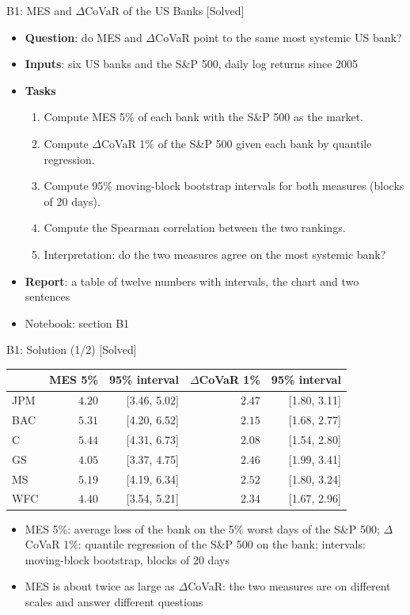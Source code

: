 \begin{frame}{B1: MES and $\Delta$CoVaR of the US Banks [Solved]}
\itemsize{\footnotesize}
\begin{itemize}
\item \textbf{Question}: do MES and $\Delta$CoVaR point to the same most systemic US bank?
\item \textbf{Inputs}: six US banks and the S\&P 500, daily log returns since 2005
\item \textbf{Tasks}
\begin{enumerate}
    \item Compute MES 5\% of each bank with the S\&P 500 as the market.
    \item Compute $\Delta$CoVaR 1\% of the S\&P 500 given each bank by quantile regression.
    \item Compute 95\% moving-block bootstrap intervals for both measures (blocks of 20 days).
    \item Compute the Spearman correlation between the two rankings.
    \item Interpretation: do the two measures agree on the most systemic bank?
\end{enumerate}
\item \textbf{Report}: a table of twelve numbers with intervals, the chart and two sentences
\item Notebook: section B1
\end{itemize}
\end{frame}

\begin{frame}{B1: Solution (1/2) [Solved]}
\itemsize{\footnotesize}
\begin{center}
\footnotesize
\begin{tabular}{lrrrr}
\toprule
& MES 5\% & 95\% interval & $\Delta$CoVaR 1\% & 95\% interval \\
\midrule
JPM & $4.20$ & [3.46, 5.02] & $2.47$ & [1.80, 3.11] \\
BAC & $5.31$ & [4.20, 6.52] & $2.15$ & [1.68, 2.77] \\
C & $5.44$ & [4.31, 6.73] & $2.08$ & [1.54, 2.80] \\
GS & $4.05$ & [3.37, 4.75] & $2.46$ & [1.99, 3.41] \\
MS & $5.19$ & [4.19, 6.34] & $2.52$ & [1.80, 3.24] \\
WFC & $4.40$ & [3.54, 5.21] & $2.34$ & [1.67, 2.96] \\
\bottomrule
\end{tabular}
\end{center}
\begin{itemize}
    \item MES 5\%: average loss of the bank on the 5\% worst days of the S\&P 500; $\Delta$CoVaR 1\%: quantile regression of the S\&P 500 on the bank; intervals: moving-block bootstrap, blocks of 20 days
    \item MES is about twice as large as $\Delta$CoVaR: the two measures are on different scales and answer different questions
\end{itemize}
\end{frame}

